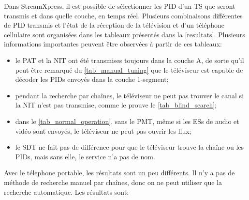\documentclass[12pt,a4paper]{article}
\begin{document}
Dans StreamXpress, il est possible de sélectionner les PID d'un TS que seront transmis et dans quelle couche, en temps réel. Plusieurs combinaisons différentes de PID transmis et l'état de la réception de la télévision et d'un téléphone cellulaire sont organisées dans les tableaux présentés dans la \autoref{resultats}. Plusieurs informations importantes peuvent être observées à partir de ces tableaux:


\begin{itemize}
\item le PAT et la NIT ont été transmises toujours dans la couche A, de sorte qu'il peut être remarqué du \autoref{tab_manual_tuning} que le téléviseur est capable de décoder les PIDs envoyés dans la couche 1-segment;
\item pendant la recherche par chaînes, le téléviseur ne peut pas trouver le canal si la NIT n'est pas transmise, comme le prouve le \autoref{tab_blind_search};
\item dans le \autoref{tab_normal_operation}, sans le PMT, même si les ESs de audio et vidéo sont envoyés, le téléviseur ne peut pas ouvrir les flux;
\item le SDT ne fait pas de différence pour que le téléviseur trouve la chaîne ou les PIDs, mais sans elle, le service n'a pas de nom.
\end{itemize}


Avec le télephone portable, les résultats sont un peu différents. Il n'y a pas de méthode de recherche manuel par chaînes, donc on ne peut utiliser que la recherche automatique. Les résultats sont:
\end{document}
